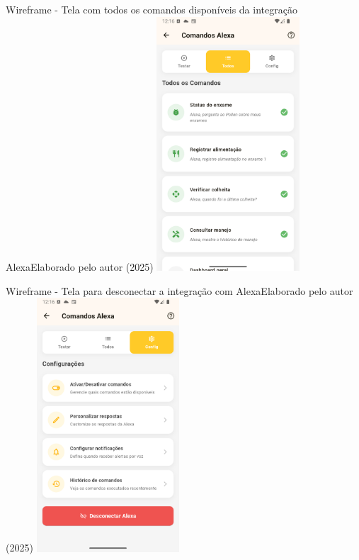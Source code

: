 \begin{figura}{Wireframe - Tela com todos os comandos disponíveis da integração Alexa}{Elaborado pelo autor (2025)}
  \centering
  \includegraphics[width=0.4\textwidth]{resources/floats/ilustracoes/todos_comandos_alexa_wireframe.png}
  \label{fig:wireframe-todos-comandos}
\end{figura}

\begin{figura}{Wireframe - Tela para desconectar a integração com Alexa}{Elaborado pelo autor (2025)}
  \centering
  \includegraphics[width=0.4\textwidth]{resources/floats/ilustracoes/desconectar_alexa_wireframe.png}
  \label{fig:wireframe-desconectar-alexa}
\end{figura}
